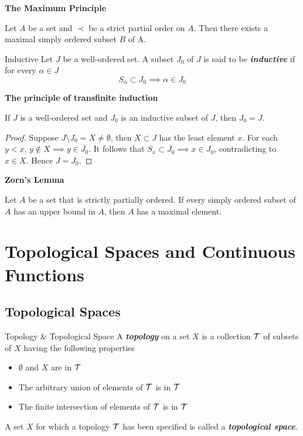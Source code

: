\documentclass[12pt,a4paper]{article}
\begin{document}
    \begin{thm}\textbf{The Maximum Principle}\hfill
    
        Let $A$ be a set and $\prec$ be a strict partial order on $A$. Then there exists a maximal simply ordered subset $B$ of A.
    \end{thm}
    \hfill

    \begin{defi}{Inductive}
        Let $J$ be a well-ordered set. A subset $J_0$ of $J$ is said to be \textit{\textbf{inductive}} if for every $\alpha\in J$
        $$
        S_\alpha\subset J_0\implies \alpha\in J_0
        $$
    \end{defi}
    \begin{thm}\textbf{The principle of transfinite induction}

        If $J$ is a well-ordered set and $J_0$ is an inductive subset of $J$, then $J_0=J$.
    \end{thm}
    \begin{proof}
        Suppose $J\setminus J_0=X\neq\emptyset$, then $X\subset J$ has the least element $x$. For each $y<x$, $y\notin X\implies y\in J_0$. It follows that $S_x\subset J_0\implies x\in J_0$, contradicting to $x\in X$. Hence $J=J_0$.
    \end{proof}
    
    \begin{lemma}\textbf{Zorn's Lemma}\hfill
    
        Let $A$ be a set that is strictly partially ordered. If every simply ordered subset of $A$ has an upper bound in $A$, then $A$ has a maximal element.    
    \end{lemma}

    \newpage

    \section{Topological Spaces and Continuous Functions}
    \hfill
    
    \subsection{Topological Spaces}
    \begin{defi}{Topology \& Topological Space}
        A \textit{\textbf{topology}} on a set $X$ is a collection $\mathcal{T}$ of subsets of $X$ having the following properties
        \begin{itemize}
            \item $\emptyset$ and $X$ are in $\mathcal{T}$
            \item The arbitrary union of elements of $\mathcal{T}$ is in $\mathcal{T}$
            \item The finite intersection of elements of $\mathcal{T}$ is in $\mathcal{T}$
        \end{itemize}
        A set $X$ for which a topology $\mathcal{T}$ has been specified is called a \textit{\textbf{topological space}}.
    \end{defi}
    \hfill
\end{document}
